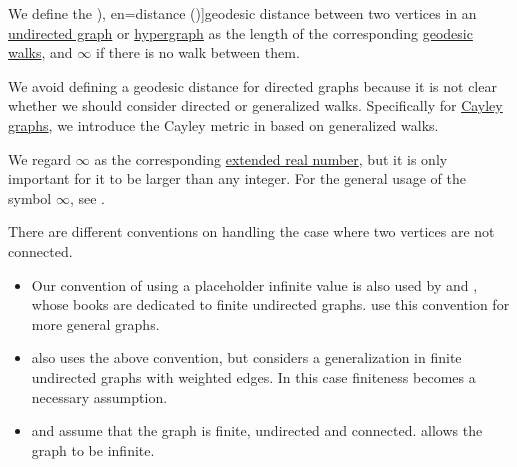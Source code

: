 \begin{definition}\label{def:graph_geodesic_distance}
  We define the \term[ru=расстояние (\cite[34]{ЕмеличевИПр1990ТеорияГрафов}), en=distance (\cite[def. 1.1.5]{Knauer2019AlgebraicGraphTheory})]{geodesic distance} between two vertices in an \hyperref[def:undirected_graph]{undirected graph} or \hyperref[def:hypergraph]{hypergraph} as the length of the corresponding \hyperref[def:graph_geodesic]{geodesic walks}, and \( \infty \) if there is no walk between them.
\end{definition}
\begin{comments}
  \item We avoid defining a geodesic distance for directed graphs because it is not clear whether we should consider directed or generalized walks. Specifically for \hyperref[def:cayley_graph]{Cayley graphs}, we introduce the Cayley metric in  based on generalized walks.

  \item We regard \( \infty \) as the corresponding \hyperref[def:extended_real_number]{extended real number}, but it is only important for it to be larger than any integer. For the general usage of the symbol \( \infty \), see .

  \item There are different conventions on handling the case where two vertices are not connected.
  \begin{itemize}
    \item Our convention of using a placeholder infinite value is also used by  and , whose books are dedicated to finite undirected graphs.  use this convention for more general graphs.

    \item {} also uses the above convention, but considers a generalization in finite undirected graphs with weighted edges. In this case finiteness becomes a necessary assumption.

    \item {} and  assume that the graph is finite, undirected and connected.  allows the graph to be infinite.
  \end{itemize}
\end{comments}

